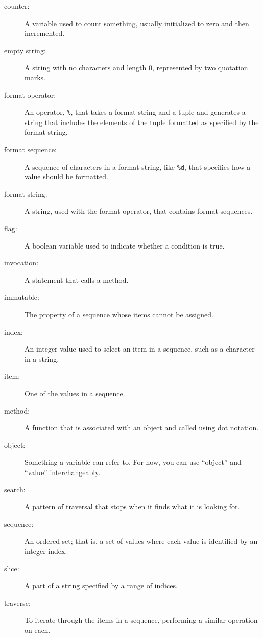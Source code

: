 \documentclass[10pt]{book}
\begin{document}
\begin{description}

\item[counter:] A variable used to count something, usually initialized
to zero and then incremented.

\item[empty string:] A string with no characters and length 0, represented
by two quotation marks.

\item[format operator:] An operator, {\tt \%}, that takes a format
string and a tuple and generates a string that includes
the elements of the tuple formatted as specified by the format string.

\item[format sequence:] A sequence of characters in a format string,
like {\tt \%d}, that specifies how a value should be formatted.

\item[format string:] A string, used with the format operator, that
contains format sequences.

\item[flag:] A boolean variable used to indicate whether a condition
is true.

\item[invocation:] A statement that calls a method.

\item[immutable:] The property of a sequence whose items cannot
be assigned.

\item[index:] An integer value used to select an item in
a sequence, such as a character in a string.

\item[item:] One of the values in a sequence.

\item[method:] A function that is associated with an object and called
using dot notation.

\item[object:] Something a variable can refer to.  For now,
you can use ``object'' and ``value'' interchangeably.

\item[search:] A pattern of traversal that stops
when it finds what it is looking for.

\item[sequence:] An ordered set; that is, a set of
values where each value is identified by an integer index.

\item[slice:] A part of a string specified by a range of indices.

\item[traverse:] To iterate through the items in a sequence,
performing a similar operation on each.

\end{description}
\end{document}
